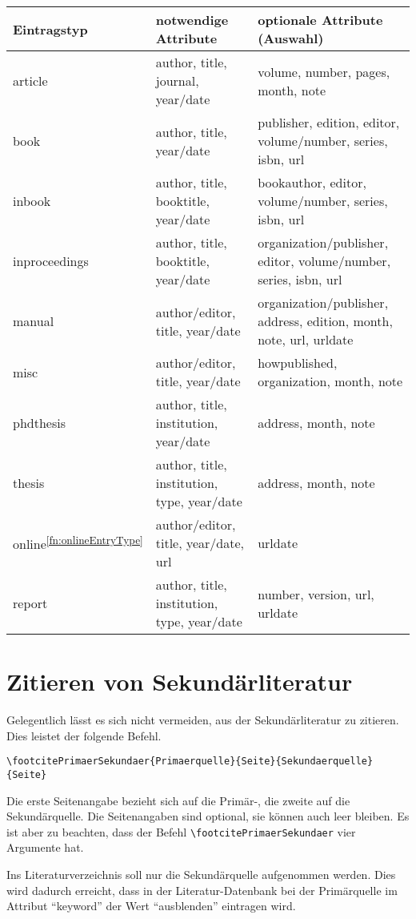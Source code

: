 \begin{tabular}{l|p{6cm}|p{6cm}}
\textbf{Eintragstyp} & \textbf{notwendige Attribute} & \textbf{optionale Attribute (Auswahl)} \\
\hline
article & author, title, journal, year/date  & volume, number, pages, month, note \\
\hline
book & author, title, year/date  & publisher, edition, editor, \mbox{volume/number}, series, isbn, url \\
\hline
inbook & author, title, booktitle, year/date  & bookauthor, editor, volume/number, series, isbn, url \\
\hline
inproceedings & author, title, booktitle, year/date  & organization/publisher, editor, volume/number, series, isbn, url  \\
\hline
manual & author/editor, title, year/date  & organization/publisher, address, edition, month, note, url, urldate \\
\hline
misc & author/editor, title, year/date & howpublished, organization, month, note \\
\hline
phdthesis & author, title, institution, year/date  & address, month, note \\
\hline
thesis & author, title, institution, type, year/date &  address, month, note \\
\hline
online\textsuperscript{\ref{fn:onlineEntryType}} & author/editor, title, year\footnotemark/date, url & urldate \\
\hline
report & author, title, institution, type, year/date & number, version, url, urldate \\
\end{tabular}



\section{Zitieren von Sekundärliteratur}\label{sec:sekundaerliteratur}
Gelegentlich lässt es sich nicht vermeiden, aus der Sekundärliteratur zu zitieren. Dies leistet der folgende Befehl.
\begin{verbatim}
\footcitePrimaerSekundaer{Primaerquelle}{Seite}{Sekundaerquelle}{Seite}
\end{verbatim}
Die erste Seitenangabe bezieht sich auf die Primär-, die zweite auf die Sekundärquelle.
Die Seitenangaben sind optional, sie können auch leer bleiben.
Es ist aber zu beachten, dass der Befehl \verb|\footcitePrimaerSekundaer| vier Argumente hat.

Ins Literaturverzeichnis soll nur die Sekundärquelle aufgenommen werden. Dies wird dadurch erreicht, dass in der Literatur-Datenbank bei der Primärquelle im Attribut \enquote{keyword} der Wert \enquote{ausblenden} eintragen wird.
